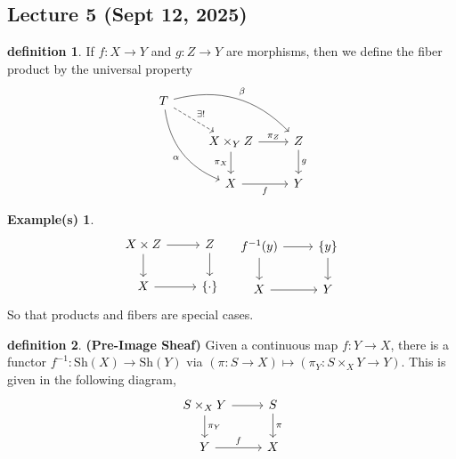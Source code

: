 \documentclass[10.5pt]{article}
\theoremstyle{definition}
\newtheorem{definition}{definition}
\newtheorem*{example}{Example(s)}
\newcommand{\set}[1]{\{#1\}}
\begin{document}

    \subsection{Lecture 5 (Sept 12, 2025)}

    \begin{definition}
        If \(f: X \to Y\) and \(g: Z \to Y\) are morphisms, then we define the fiber product by the universal property
        \begin{equation*}
            \begin{tikzcd}
                T
                \arrow[bend left]{drr}{\beta}
                \arrow[bend right,swap]{ddr}{\alpha}
                \arrow[dashed]{dr}{\exists !} & & \\
                & X \times_Y Z \arrow{r}{\pi_Z} \arrow{d}[swap]{\pi_X}
                & Z \arrow{d}{g} \\
                & X \arrow[swap]{r}{f}
                & Y
            \end{tikzcd}
        \end{equation*}
    \end{definition}
    \begin{example}
        \begin{equation*}
            \begin{tikzcd}
                X \times Z \arrow[r] \arrow[d] &Z \arrow[d] \\ X \arrow[r] & \set{\cdot}
            \end{tikzcd} \quad
            \begin{tikzcd}
                f^{-1}(y) \arrow[r] \arrow[d] &\set{y} \arrow[d] \\ X \arrow[r] & Y
            \end{tikzcd}
        \end{equation*}
        So that products and fibers are special cases.
    \end{example}
    \begin{definition}
        \textbf{(Pre-Image Sheaf)} Given a continuous map \(f: Y \to X\), there is a functor \(f^{-1}: \text{Sh}(X) \to \text{Sh}(Y)\) via \((\pi:S\to X) \mapsto (\pi_Y: S \times_X Y \to Y)\). This is given in the following diagram,
        \begin{equation*}
            \begin{tikzcd}
                S \times_X Y \arrow[r] \arrow[d,"\pi_Y"] &S \arrow[d,"\pi"] \\ Y \arrow[r,"f"] & X
            \end{tikzcd} 
        \end{equation*}
    \end{definition}
\end{document}
